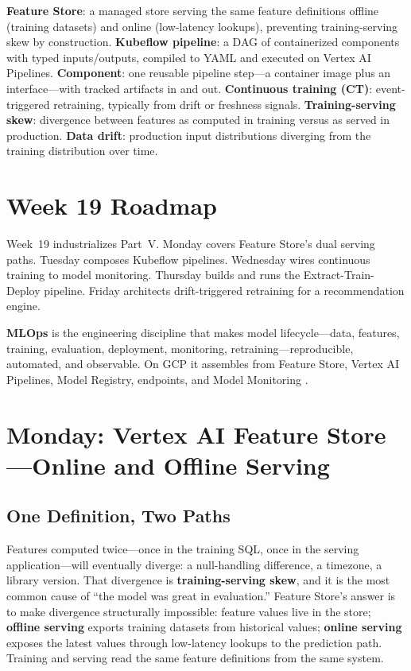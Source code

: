 \begin{keyterms}
\textbf{Feature Store}: a managed store serving the same feature definitions offline (training datasets) and online (low-latency lookups), preventing training-serving skew by construction.
\textbf{Kubeflow pipeline}: a DAG of containerized components with typed inputs/outputs, compiled to YAML and executed on Vertex AI Pipelines.
\textbf{Component}: one reusable pipeline step---a container image plus an interface---with tracked artifacts in and out.
\textbf{Continuous training (CT)}: event-triggered retraining, typically from drift or freshness signals.
\textbf{Training-serving skew}: divergence between features as computed in training versus as served in production.
\textbf{Data drift}: production input distributions diverging from the training distribution over time.
\end{keyterms}

\section{Week 19 Roadmap}
Week~19 industrializes Part~V. Monday covers Feature Store's dual serving paths. Tuesday composes Kubeflow pipelines. Wednesday wires continuous training to model monitoring. Thursday builds and runs the Extract-Train-Deploy pipeline. Friday architects drift-triggered retraining for a recommendation engine.

\begin{definitionbox}
\textbf{MLOps} is the engineering discipline that makes model lifecycle---data, features, training, evaluation, deployment, monitoring, retraining---reproducible, automated, and observable. On GCP it assembles from Feature Store, Vertex AI Pipelines, Model Registry, endpoints, and Model Monitoring \cite{googlecloudvertexpipelines,googlecloudfeaturestore}.
\end{definitionbox}

\section{Monday: Vertex AI Feature Store---Online and Offline Serving}

\subsection{One Definition, Two Paths}
Features computed twice---once in the training SQL, once in the serving application---will eventually diverge: a null-handling difference, a timezone, a library version. That divergence is \textbf{training-serving skew}, and it is the most common cause of ``the model was great in evaluation.'' Feature Store's answer is to make divergence structurally impossible: feature values live in the store; \textbf{offline serving} exports training datasets from historical values; \textbf{online serving} exposes the latest values through low-latency lookups to the prediction path. Training and serving read the same feature definitions from the same system.

